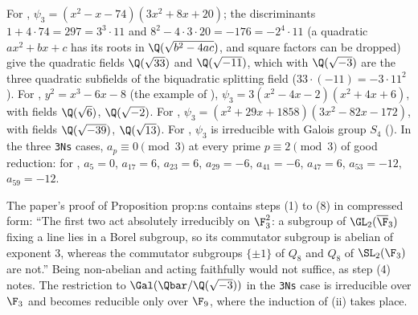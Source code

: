 \begin{example}\label{ex:galrep:ns-examples}
For , $\psi_3=(x^2-x-74)(3x^2+8x+20)$; the discriminants $1+4\cdot74=297=3^3\cdot11$ and $8^2-4\cdot3\cdot20=-176=-2^4\cdot11$ (a quadratic $ax^2+bx+c$
has its roots in $\Q(\sqrt{b^2-4ac})$, and square factors can be dropped) give the quadratic fields $\Q(\sqrt{33})$ and
$\Q(\sqrt{-11})$, which with $\Q(\sqrt{-3})$ are the three quadratic subfields of the biquadratic splitting field ($33\cdot(-11)=-3\cdot11^2$). For ,
$y^2=x^3-6x-8$ (the example of ), $\psi_3=3(x^2-4x-2)(x^2+4x+6)$, with fields $\Q(\sqrt6)$, $\Q(\sqrt{-2})$. For ,
$\psi_3=(x^2+29x+1858)(3x^2-82x-172)$, with fields $\Q(\sqrt{-39})$, $\Q(\sqrt{13})$. For , $\psi_3$ is irreducible with Galois group $S_4$
(). In the three \texttt{3Ns} cases, $a_p\equiv0\pmod3$ at every prime $p\equiv2\pmod3$ of good reduction: for , $a_5=0$,
$a_{17}=6$, $a_{23}=6$, $a_{29}=-6$, $a_{41}=-6$, $a_{47}=6$, $a_{53}=-12$, $a_{59}=-12$.
\end{example}

\begin{paperlink}
The paper's proof of Proposition prop:ns contains steps (1) to (8) in compressed form: ``The first two act absolutely
irreducibly on $\F_3^2$: a subgroup of $\GL_2(\overline\F_3)$ fixing a line lies in a Borel subgroup, so its commutator subgroup is abelian of exponent $3$,
whereas the commutator subgroups $\{\pm1\}$ of $Q_8$ and $Q_8$ of $\SL_2(\F_3)$ are not.'' Being non-abelian and acting faithfully would not suffice, as step (4) notes. The restriction to $\Gal(\Qbar/\Q(\sqrt{-3}))$ in the
\texttt{3Ns} case is irreducible over $\F_3$ and becomes reducible only over $\F_9$, where the induction of (ii) takes place.
\end{paperlink}

